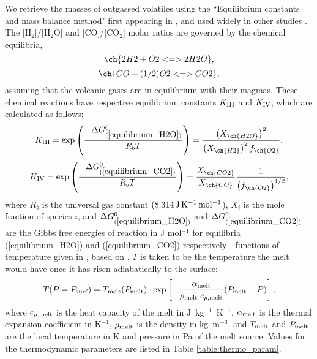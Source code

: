 We retrieve the masses of outgassed volatiles using the ``Equilibrium constants and mass balance method" first appearing in \citet{French1966}, and used widely in other studies \citep{Holland1984, gaillard_theoretical_2014, Fegley2013, schaefer_redox_2017, ortenzi_mantle_2020}. The [H$_2$]/[H$_2$O] and [CO]/[CO$_2$] molar ratios are governed by the chemical equilibria,
\begin{equation}\label{equilibrium_H2O}
    \ch{2 H2 +  O2 <=> 2 H2O},
\end{equation}
\begin{equation}\label{equilibrium_CO2}
    \ch{CO + (1/2) O2 <=> CO2},
    \end{equation}
assuming that the volcanic gases are in equilibrium with their magmas. These chemical reactions have respective equilibrium constants $K_{\rm III}$ and $K_{\rm IV}$, which are calculated as follows:
\begin{equation}\label{eq:equilibrium_constant_hydrogen}
   {K_{\rm III}}  = \exp\left(\frac{-\Delta G^0_{(\ref{equilibrium_H2O})} }{R_bT}\right) = \frac{\left(X_{\ch{H2O}}\right)^2}{\left(X_{\ch{H2}}\right)^2f_{\ch{O2}}} , 
\end{equation}
\begin{equation}\label{eq:equilibrium_constant_carbon}
    {K_{\rm IV}}  = \exp\left(\frac{-\Delta G^0_{(\ref{equilibrium_CO2})}}{R_bT}\right) = \frac{X_{\ch{CO2}}}{X_{\ch{CO}}}\frac{1}{\left(f_{\ch{O2}}\right)^{1/2}},
\end{equation}
where $R_b$ is the universal gas constant $(8.314 \, {\rm J\,K^{-1}\, mol^{-1}}$), $X_{i}$ is the mole fraction of species $i$, and $\Delta G^0_{(\ref{equilibrium_H2O})}$ and $\Delta G^0_{(\ref{equilibrium_CO2})}$ are the Gibbs free energies of reaction in J mol$^{-1}$ for equilibria (\ref{equilibrium_H2O}) and (\ref{equilibrium_CO2}) respectively---functions of temperature given in \citet{ortenzi_mantle_2020}, based on \citet{Fegley2013}. $T$ is taken to be the temperature the melt would have once it has risen adiabatically to the surface:
\begin{equation}\label{eq:adiabatic_T_melt}
    T (P = P_{\rm surf}) = T_{\rm melt}(P_{\rm melt}) \cdot \exp \left[ -\frac{\alpha_{\rm melt}}{\rho_{\rm melt} \; c_{p,{\rm melt}}} (P_{\rm melt} - P) \right],
\end{equation}
where $c_{p,{\rm melt}}$ is the heat capacity of the melt in J~kg$^{-1}$~K$^{-1}$, $\alpha_{\rm melt}$ is the thermal expansion coefficient in K$^{-1}$, $\rho_{\rm melt}$ is the density in kg~m$^{-3}$, and $T_{\rm melt}$ and $P_{\rm melt}$ are the local temperature in K and pressure in Pa of the melt source. Values for the thermodynamic parameters are listed in Table \ref{table:thermo_param}.

